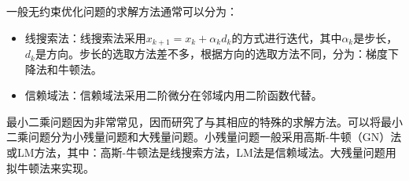 一般无约束优化问题的求解方法通常可以分为：

\begin{itemize}
\item 线搜索法：线搜索法采用$x_{k+1}=x_k+\alpha_k d_k$的方式进行迭代，其中$\alpha_k$是步长，$d_k$是方向。步长的选取方法差不多，根据方向的选取方法不同，分为：梯度下降法和牛顿法。
\item 信赖域法：信赖域法采用二阶微分在邻域内用二阶函数代替。
\end{itemize}

最小二乘问题因为非常常见，因而研究了与其相应的特殊的求解方法。可以将最小二乘问题分为小残量问题和大残量问题。小残量问题一般采用高斯-牛顿（GN）法或LM方法，其中：高斯-牛顿法是线搜索方法，LM法是信赖域法。大残量问题用拟牛顿法来实现。